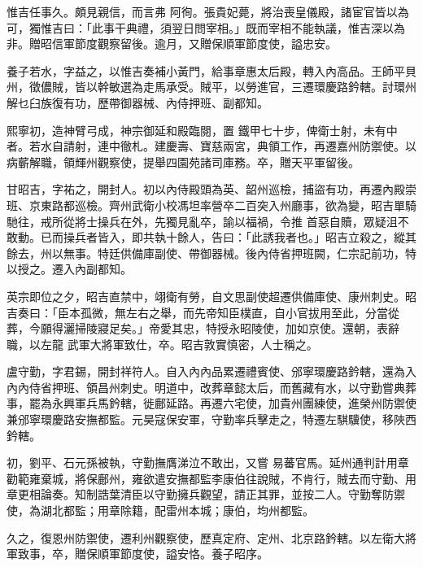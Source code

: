 \begin{pinyinscope}
 惟吉任事久。頗見親信，而言弗
 阿徇。張貴妃薨，將治喪皇儀殿，諸宦官皆以為可，獨惟吉曰：「此事干典禮，須翌日問宰相。」既而宰相不能執議，惟吉深以為非。贈昭信軍節度觀察留後。逾月，又贈保順軍節度使，謚忠安。



 養子若水，字益之，以惟吉奏補小黃門，給事章惠太后殿，轉入內高品。王師平貝州，徵儂賊，皆以幹敏選為走馬承受。賊平，以勞進官，三遷環慶路鈐轄。討環州解乜臼族復有功，歷帶御器械、內侍押班、副都知。



 熙寧初，造神臂弓成，神宗御延和殿臨閱，置
 鐵甲七十步，俾衛士射，未有中者。若水自請射，連中徹札。建慶壽、寶慈兩宮，典領工作，再遷嘉州防禦使。以病蘄解職，領輝州觀察使，提舉四園苑諸司庫務。卒，贈天平軍留後。



 甘昭吉，字祐之，開封人。初以內侍殿頭為英、韶州巡檢，捕盜有功，再遷內殿崇班、京東路都巡檢。齊州武衛小校馮坦率營卒二百突入州廳事，欲為變，昭吉單騎馳往，戒所從將士操兵在外，先獨見亂卒，諭以福禍，令推
 首惡自贖，眾疑沮不敢動。已而操兵者皆入，即共執十餘人，告曰：「此誘我者也。」昭吉立殺之，縱其餘去，州以無事。特廷供備庫副使、帶御器械。後內侍省押班闕，仁宗記前功，特以授之。遷入內副都知。



 英宗即位之夕，昭吉直禁中，翊衛有勞，自文思副使超遷供備庫使、康州刺史。昭吉奏曰：「臣本孤微，無左右之舉，而先帝知臣樸直，自小官拔用至此，分當從葬，今願得灑掃陵寢足矣。」帝愛其忠，特授永昭陵使，加如京使。還朝，表辭職，以左龍
 武軍大將軍致仕，卒。昭吉敦實慎密，人士稱之。



 盧守勤，字君錫，開封祥符人。自入內內品累遷禮賓使、邠寧環慶路鈐轄，還為入內內侍省押班、領昌州刺史。明道中，改葬章懿太后，而舊藏有水，以守勤嘗典葬事，罷為永興軍兵馬鈐轄，徙鄜延路。再遷六宅使，加貴州團練使，進榮州防禦使兼邠寧環慶路安撫都監。元昊寇保安軍，守勤率兵擊走之，特遷左騏驥使，移陜西鈐轄。



 初，劉平、石元孫被執，守勤撫膺涕泣不敢出，又嘗
 易蕃官馬。延州通判計用章勸範雍棄城，將保鄜州，雍欲遣安撫都監李康伯往說賊，不肯行，賊去而守勤、用章更相論奏。知制誥葉清臣以守勤擁兵觀望，請正其罪，並按二人。守勤奪防禦使，為湖北都監；用章除籍，配雷州本城；康伯，均州都監。



 久之，復恩州防禦使，遷利州觀察使，歷真定府、定州、北京路鈐轄。以左衛大將軍致事，卒，贈保順軍節度使，謚安恪。養子昭序。




\end{pinyinscope}
